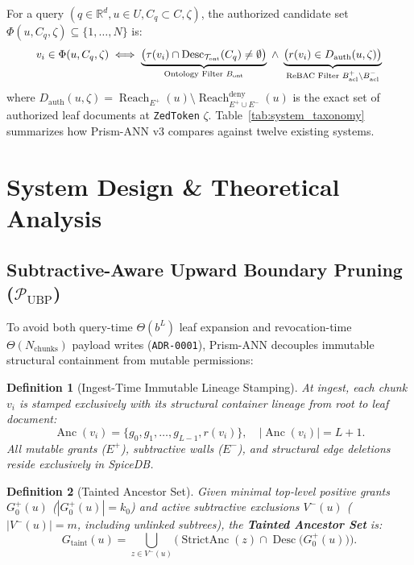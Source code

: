 \documentclass[conference]{IEEEtran}
\newtheorem{definition}{Definition}
\begin{document}
For a query $(q \in \mathbb{R}^d, u \in U, C_q \subset C, \zeta)$, the authorized candidate set $\Phi(u, C_q, \zeta) \subseteq \{1, \dots, N\}$ is:
\begin{equation}
\label{eq:composite_filter}
\resizebox{0.89\columnwidth}{!}{$\displaystyle
v_i \in \Phi(u, C_q, \zeta) \iff \underbrace{\big(\tau(v_i) \cap \operatorname{Desc}_{\mathcal{T}_{\text{ont}}}(C_q) \neq \emptyset\big)}_{\text{Ontology Filter } B_{\text{ont}}} \;\land\; \underbrace{\big(r(v_i) \in D_{\text{auth}}(u, \zeta)\big)}_{\text{ReBAC Filter } B_{\text{acl}}^+ \setminus B_{\text{acl}}^-}
$}
\end{equation}
where $D_{\text{auth}}(u, \zeta) = \operatorname{Reach}_{E^+}(u) \setminus \operatorname{Reach}_{E^+ \cup E^-}^{\text{deny}}(u)$ is the exact set of authorized leaf documents at \texttt{ZedToken} $\zeta$. Table~\ref{tab:system_taxonomy} summarizes how Prism-ANN v3 compares against twelve existing systems.

\section{System Design \& Theoretical Analysis}
\label{sec:design}

\subsection{Subtractive-Aware Upward Boundary Pruning ($\mathcal{P}_{\text{UBP}}$)}
\label{sec:ubp}

To avoid both query-time $\Theta(b^L)$ leaf expansion and revocation-time $\Theta(N_{\text{chunks}})$ payload writes (\texttt{ADR-0001}), Prism-ANN decouples immutable structural containment from mutable permissions:
\begin{definition}[Ingest-Time Immutable Lineage Stamping]
At ingest, each chunk $v_i$ is stamped exclusively with its structural container lineage from root to leaf document:
\begin{equation}
\operatorname{Anc}(v_i) = \{g_0, g_1, \dots, g_{L-1}, r(v_i)\}, \quad |\operatorname{Anc}(v_i)| = L + 1.
\end{equation}
All mutable grants ($E^+$), subtractive walls ($E^-$), and structural edge deletions reside exclusively in SpiceDB.
\end{definition}

\begin{definition}[Tainted Ancestor Set]
Given minimal top-level positive grants $G_0^+(u)$ ($|G_0^+(u)| = k_0$) and active subtractive exclusions $V^-(u)$ ($|V^-(u)| = m$, including unlinked subtrees), the \textbf{Tainted Ancestor Set} is:
\begin{equation}
\label{eq:tainted_set}
G_{\text{taint}}(u) = \bigcup_{z \in V^-(u)} \Big( \operatorname{StrictAnc}(z) \cap \operatorname{Desc}\big(G_0^+(u)\big) \Big).
\end{equation}
\end{definition}
\end{document}
